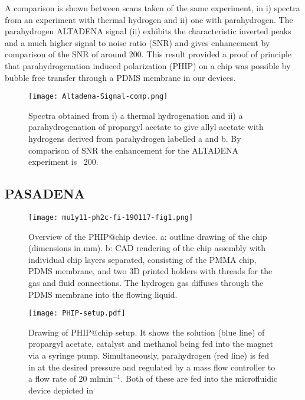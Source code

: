 A comparison is shown between scans taken of the same experiment, in  i) spectra
from an experiment with thermal hydrogen and ii) one with parahydrogen. The parahydrogen
ALTADENA signal (ii) exhibits the characteristic inverted peaks and a much higher signal
to noise ratio (SNR) and gives enhancement by comparison of the SNR of around 200.
This result provided a proof of principle that parahydrogenation induced polarization (PHIP) on a chip
was possible by bubble free transfer through a PDMS membrane in our devices.

\begin{figure}[ht]
  \begin{center}
  \texttt{[image: Altadena-Signal-comp.png]}
  \end{center}
  \caption{Spectra obtained from i) a thermal hydrogenation and ii) a parahydrogenation
  of propargyl acetate to give allyl acetate with hydrogens derived from parahydrogen labelled a and
  b. By comparison of SNR the enhancement for the ALTADENA experiment is ~200. }
  \label{fig:AltadenaResults}
\end{figure}

\newpage

\subsection{PASADENA}

\begin{figure}[!ht]
	\centering
	\texttt{[image: mu1y11-ph2c-fi-190117-fig1.png]}
	\caption{Overview of the PHIP@chip device.
    a: outline drawing of the chip (dimensions in mm).
		b: CAD rendering of the chip assembly with individual chip layers
		separated, consisting of the PMMA chip, PDMS membrane, and two 3D
		printed holders with threads for the gas and fluid connections.
    The hydrogen gas
		diffuses through the PDMS membrane into the flowing liquid.
		}
	\label{fig:phip@chip1}
\end{figure}

\begin{figure}
  \begin{center}
  \texttt{[image: PHIP-setup.pdf]}
  \end{center}
  \caption{Drawing of PHIP@chip setup. It shows the solution (blue line)
  of propargyl acetate, catalyst and methanol being fed into the magnet
  via a syringe pump. Simultaneously, parahydrogen (red line) is fed in
  at the desired pressure and regulated by a mass flow controller to a
  flow rate of 20 ml$\text{min}^{-1}$. Both of these are fed into the
  microfluidic device depicted in }
  \label{fig:SetUp}
\end{figure}

